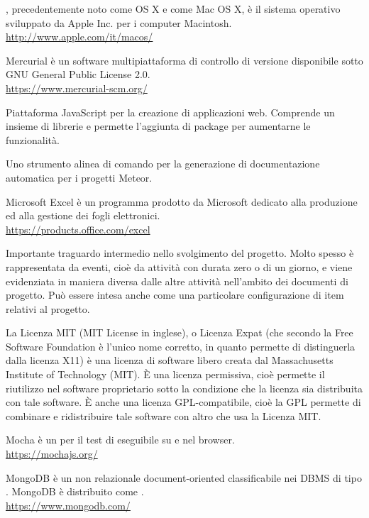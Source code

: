 \Macos, precedentemente noto come OS X e come Mac OS X, è il sistema operativo sviluppato da Apple Inc. per i computer Macintosh.\\
\url{http://www.apple.com/it/macos/}

Mercurial è un software multipiattaforma di controllo di versione disponibile sotto GNU General Public License 2.0.\\
\url{https://www.mercurial-scm.org/}

Piattaforma JavaScript per la creazione di applicazioni web. Comprende un insieme di librerie e permette l'aggiunta di package per aumentarne le funzionalità.

Uno strumento alinea di comando per la generazione di documentazione automatica per i progetti Meteor.

Microsoft Excel è un programma prodotto da Microsoft dedicato alla produzione ed alla gestione dei fogli elettronici.\\
\url{https://products.office.com/excel}

Importante traguardo intermedio nello svolgimento del progetto. Molto spesso è rappresentata da eventi, cioè da attività con durata zero o di un giorno, e viene evidenziata in maniera diversa dalle altre attività nell'ambito dei documenti di progetto. Può essere intesa anche come una particolare configurazione di item relativi al progetto.

La Licenza MIT (MIT License in inglese), o Licenza Expat (che secondo la Free Software Foundation è l'unico nome corretto, in quanto permette di distinguerla dalla licenza X11) è una licenza di software libero creata dal Massachusetts Institute of Technology (MIT). \`{E} una licenza permissiva, cioè permette il riutilizzo nel software proprietario sotto la condizione che la licenza sia distribuita con tale software. \`{E} anche una licenza GPL-compatibile, cioè la GPL permette di combinare e ridistribuire tale software con altro che usa la Licenza MIT.

Mocha è un  per il test di  eseguibile su  e nel browser.\\
\url{https://mochajs.org/}

MongoDB è un  non relazionale document-oriented classificabile nei DBMS di tipo . MongoDB è distribuito come  .\\
\url{https://www.mongodb.com/}

\clearpage
